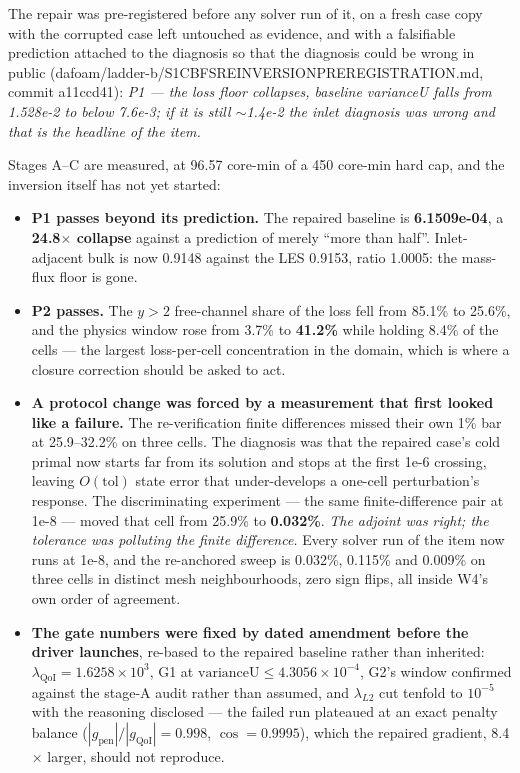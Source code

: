 \documentclass[11pt,a4paper]{article}
\newcommand{\breakus}{\textunderscore\allowbreak}
\newcommand{\code}[1]{{\small\ttfamily\let\_\breakus #1}}
\newcommand{\artifact}[1]{{\footnotesize\ttfamily\let\_\breakus #1}}
\begin{document}
The repair was pre-registered before any solver run of it, on a fresh case copy with the
corrupted case left untouched as evidence, and with a falsifiable prediction attached to the
diagnosis so that the diagnosis could be wrong in public
(\artifact{dafoam/ladder-b/S1\_CBFS\_REINVERSION\_PREREGISTRATION.md}, commit
\code{a11ccd41}): \emph{P1 --- the loss floor collapses, baseline \code{varianceU} falls
from 1.528e-2 to below 7.6e-3; if it is still $\sim$1.4e-2 the inlet diagnosis was wrong
and that is the headline of the item.}

Stages A--C are measured, at 96.57 core-min of a 450 core-min hard cap, and the inversion
itself has not yet started:

\begin{itemize}
\item \textbf{P1 passes beyond its prediction.} The repaired baseline is
  \textbf{6.1509e-04}, a \textbf{24.8$\times$ collapse} against a prediction of merely
  ``more than half''. Inlet-adjacent bulk is now 0.9148 against the LES 0.9153, ratio
  1.0005: the mass-flux floor is gone.
\item \textbf{P2 passes.} The $y > 2$ free-channel share of the loss fell from 85.1\% to
  25.6\%, and the physics window rose from 3.7\% to \textbf{41.2\%} while holding 8.4\% of
  the cells --- the largest loss-per-cell concentration in the domain, which is where a
  closure correction should be asked to act.
\item \textbf{A protocol change was forced by a measurement that first looked like a
  failure.} The re-verification finite differences missed their own 1\% bar at 25.9--32.2\%
  on three cells. The diagnosis was that the repaired case's cold primal now starts far
  from its solution and stops at the first 1e-6 crossing, leaving $O(\mathrm{tol})$ state
  error that under-develops a one-cell perturbation's response. The discriminating
  experiment --- the same finite-difference pair at 1e-8 --- moved that cell from 25.9\% to
  \textbf{0.032\%}. \emph{The adjoint was right; the tolerance was polluting the finite
  difference.} Every solver run of the item now runs at 1e-8, and the re-anchored sweep is
  0.032\%, 0.115\% and 0.009\% on three cells in distinct mesh neighbourhoods, zero sign
  flips, all inside W4's own order of agreement.
\item \textbf{The gate numbers were fixed by dated amendment before the driver launches},
  re-based to the repaired baseline rather than inherited: $\lambda_{\mathrm{QoI}} =
  1.6258\times10^{3}$, G1 at $\mathrm{varianceU} \leq 4.3056\times10^{-4}$, G2's window
  confirmed against the stage-A audit rather than assumed, and $\lambda_{L2}$ cut tenfold
  to $10^{-5}$ with the reasoning disclosed --- the failed run plateaued at an exact
  penalty balance ($|g_{\mathrm{pen}}|/|g_{\mathrm{QoI}}| = 0.998$, $\cos = 0.9995$),
  which the repaired gradient, 8.4$\times$ larger, should not reproduce.
\end{itemize}
\end{document}
